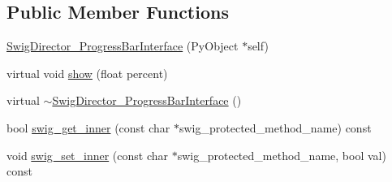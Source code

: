 \subsection*{Public Member Functions}
\begin{DoxyCompactItemize}
\item 
\hyperlink{classSwigDirector__ProgressBarInterface_a24add52bac381bb2d0b2a01b09bd2a4f}{Swig\+Director\+\_\+\+Progress\+Bar\+Interface} (Py\+Object $\ast$self)
\item 
virtual void \hyperlink{classSwigDirector__ProgressBarInterface_a50f5d7778022e27d2f9dfa0b79e84dce}{show} (float percent)
\item 
virtual \hyperlink{classSwigDirector__ProgressBarInterface_a98e8dbc1e4b81ad2c0b8ea1ac2006dc3}{$\sim$\+Swig\+Director\+\_\+\+Progress\+Bar\+Interface} ()
\item 
bool \hyperlink{classSwigDirector__ProgressBarInterface_aca008c5d9c4dafd39fd494c6e060a5e4}{swig\+\_\+get\+\_\+inner} (const char $\ast$swig\+\_\+protected\+\_\+method\+\_\+name) const 
\item 
void \hyperlink{classSwigDirector__ProgressBarInterface_a9efd6adb1d3e2286ea9e4ac6487b5e79}{swig\+\_\+set\+\_\+inner} (const char $\ast$swig\+\_\+protected\+\_\+method\+\_\+name, bool val) const 
\end{DoxyCompactItemize}


